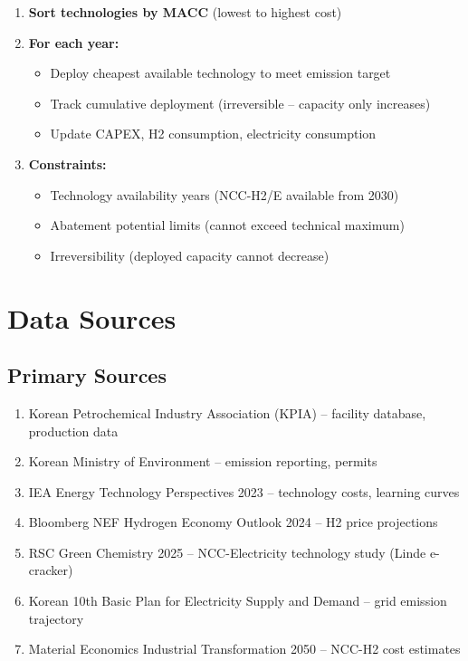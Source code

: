 \documentclass[11pt,a4paper]{report}
\begin{document}
\begin{enumerate}[leftmargin=*]
    \item \textbf{Sort technologies by MACC} (lowest to highest cost)
    \item \textbf{For each year:}
    \begin{itemize}
        \item Deploy cheapest available technology to meet emission target
        \item Track cumulative deployment (irreversible -- capacity only increases)
        \item Update CAPEX, H2 consumption, electricity consumption
    \end{itemize}
    \item \textbf{Constraints:}
    \begin{itemize}
        \item Technology availability years (NCC-H2/E available from 2030)
        \item Abatement potential limits (cannot exceed technical maximum)
        \item Irreversibility (deployed capacity cannot decrease)
    \end{itemize}
\end{enumerate}

\chapter{Data Sources}

\section{Primary Sources}

\begin{enumerate}
    \item Korean Petrochemical Industry Association (KPIA) -- facility database, production data
    \item Korean Ministry of Environment -- emission reporting, permits
    \item IEA Energy Technology Perspectives 2023 -- technology costs, learning curves
    \item Bloomberg NEF Hydrogen Economy Outlook 2024 -- H2 price projections
    \item RSC Green Chemistry 2025 -- NCC-Electricity technology study (Linde e-cracker)
    \item Korean 10th Basic Plan for Electricity Supply and Demand -- grid emission trajectory
    \item Material Economics Industrial Transformation 2050 -- NCC-H2 cost estimates
\end{enumerate}
\end{document}
